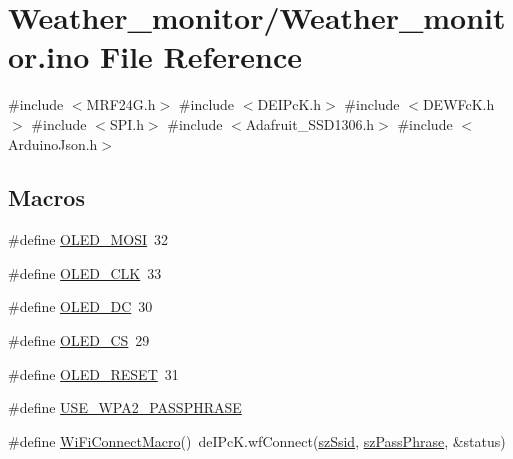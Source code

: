 \hypertarget{_weather__monitor_8ino}{}\section{Weather\+\_\+monitor/\+Weather\+\_\+monitor.ino File Reference}
\label{_weather__monitor_8ino}
{\ttfamily \#include $<$M\+R\+F24\+G.\+h$>$}\newline
{\ttfamily \#include $<$D\+E\+I\+Pc\+K.\+h$>$}\newline
{\ttfamily \#include $<$D\+E\+W\+Fc\+K.\+h$>$}\newline
{\ttfamily \#include $<$S\+P\+I.\+h$>$}\newline
{\ttfamily \#include $<$Adafruit\+\_\+\+S\+S\+D1306.\+h$>$}\newline
{\ttfamily \#include $<$Arduino\+Json.\+h$>$}\newline
\subsection*{Macros}
\begin{DoxyCompactItemize}
\item 
\#define \hyperlink{_weather__monitor_8ino_a9065e33a0ffff5f88cb1bb46e2bb38f3}{O\+L\+E\+D\+\_\+\+M\+O\+SI}~32
\item 
\#define \hyperlink{_weather__monitor_8ino_a8ada351153327868280ab3e62367f927}{O\+L\+E\+D\+\_\+\+C\+LK}~33
\item 
\#define \hyperlink{_weather__monitor_8ino_ab92f2aedff7d366df56a26b3c9c9d795}{O\+L\+E\+D\+\_\+\+DC}~30
\item 
\#define \hyperlink{_weather__monitor_8ino_ab68a9b3dbffcafd9849e74c4998b8840}{O\+L\+E\+D\+\_\+\+CS}~29
\item 
\#define \hyperlink{_weather__monitor_8ino_a619e07239fb3b9b14d40646ab41d5b4f}{O\+L\+E\+D\+\_\+\+R\+E\+S\+ET}~31
\item 
\#define \hyperlink{_weather__monitor_8ino_a0999ef52ab573032899b9a121c8b4f56}{U\+S\+E\+\_\+\+W\+P\+A2\+\_\+\+P\+A\+S\+S\+P\+H\+R\+A\+SE}
\item 
\#define \hyperlink{_weather__monitor_8ino_a695a93af45d920c92b31480f73207dbe}{Wi\+Fi\+Connect\+Macro}()~de\+I\+Pc\+K.\+wf\+Connect(\hyperlink{_weather__monitor_8ino_a6d4a0a4278dcba2bd3f1a41ebf5157a5}{sz\+Ssid}, \hyperlink{_weather__monitor_8ino_a498a9cc5754dacf2e488cddd337a5f4f}{sz\+Pass\+Phrase}, \&status)
\end{DoxyCompactItemize}
